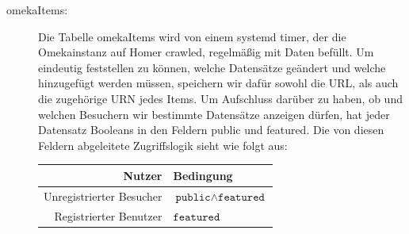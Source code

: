 \documentclass{article}
\begin{document}
\begin{description}
\item[omekaItems:]
    Die Tabelle omekaItems wird von einem systemd timer,
    der die Omekainstanz auf Homer crawled,
    regelmäßig mit Daten befüllt.
    Um eindeutig feststellen zu können,
    welche Datensätze geändert und welche hinzugefügt werden müssen,
    speichern wir dafür sowohl die URL,
    als auch die zugehörige URN jedes Items.
    Um Aufschluss darüber zu haben,
    ob und welchen Besuchern wir bestimmte Datensätze anzeigen dürfen,
    hat jeder Datensatz Booleans in den Feldern public und featured.
    Die von diesen Feldern abgeleitete Zugriffslogik sieht wie folgt aus:

    \begin{tabular}{r|l}
    Nutzer & Bedingung\\\hline
    Unregistrierter Besucher & $\texttt{public}\land\texttt{featured}$\\
    Registrierter Benutzer & $\texttt{featured}$%
    \end{tabular}


\end{description}
\end{document}
